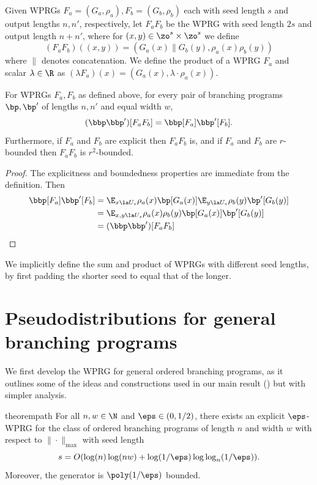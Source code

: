 \begin{definition}\label{def:prodrule}
Given WPRGs $F_a=(G_a,\rho_a),F_b=(G_b,\rho_b)$ each with seed length $s$ and output lengths $n,n'$, respectively, %
let $F_aF_b$ be the WPRG with seed length $2s$ and output length $n+n'$, where for $(x,y)\in \zo^s\times\zo^s$ we define
\[(F_a F_b)((x,y)) = (G_a(x)\|G_b(y),\rho_a(x)\rho_b(y))\]
where $\|$ denotes concatenation. We define the product of a WPRG $F_a$ and scalar $\lambda \in \R$ as $(\lambda F_a)(x)=(G_a(x),\lambda\cdot\rho_a(x))$.
\end{definition}
\begin{lemma}
For WPRGs $F_a,F_b$ as defined above, for every pair of branching programs $\bp,\bp'$ of lengths $n,n'$ and equal width $w$,
$$(\bbp\bbp')[F_aF_b]=\bbp[F_a]\bbp'[F_b].$$
Furthermore, if $F_a$ and $F_b$ are explicit then $F_aF_b$ is, and if $F_a$ and $F_b$ are $r$-bounded then $F_aF_b$ is $r^2$-bounded.
\end{lemma}
\begin{proof}
The explicitness and boundedness properties are immediate from the definition. 
Then %
\begin{align*}
\bbp[F_a]\bbp'[F_b] &= \E_{x\la U_s}\rho_a(x)\bp[G_a(x)]\E_{y\la U_s}\rho_b(y)\bp'[G_b(y)]\\
&= \E_{x,y\la U_s}\rho_a(x)\rho_b(y)\bp[G_a(x)]\bp'[G_b(y)]\\
&= (\bbp\bbp')[F_aF_b] \qedhere
\end{align*}
\end{proof}
We implicitly define the sum and product of WPRGs with different seed lengths, by first padding the shorter seed to equal that of the longer.
    
\section{Pseudodistributions for general branching programs}\label{sec:path}
    We first develop the WPRG for general ordered branching programs, as it outlines some of the ideas and constructions used in our main result () but with simpler analysis.
    \begin{restatable}{theorem}{path}\label{thm:path}
        For all $n,w \in \N$ and $\eps \in (0,1/2)$, there exists an explicit $\eps$-WPRG for the class of ordered branching programs of length $n$ and width $w$ with respect to $\|\cdot\|_{\max}$ with seed length
        \[s=O(\log(n)\log(nw)+\log(1/\eps)\log\log_{n}(1/\eps)).\]
        Moreover, the generator is $\poly(1/\eps)$ bounded.
    \end{restatable}

